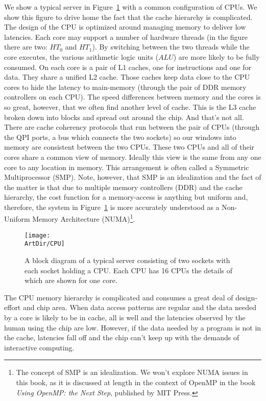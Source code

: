 We show a typical server in Figure~\ref{figure:CPU} with a common configuration of CPUs.   
We show this figure to drive home the fact that the cache hierarchy is complicated.  The design
of the CPU is optimized around managing memory to deliver low latencies.   Each core may
support a number of hardware threads (in the figure there are two: $HT_0$ and $HT_1$).  By switching between the two threads
while the core executes, the various arithmetic logic units ($ALU$) are more likely to be fully consumed.
On each core is a pair of L1 caches, one for instructions and one for
data.  They share a unified L2 cache.   Those caches keep data close to the CPU cores to hide the latency
to main-memory (through the pair of DDR memory controllers on each CPU).  The speed differences
between memory and the cores is so great, however, that we often find another level of cache.  This is the L3 
cache broken down into blocks and spread out around the chip.   And that's not all.  There are cache coherency
protocols that run between the pair of CPUs (through the QPI ports, a bus which connects the two sockets) 
so our windows into memory are
consistent between the two CPUs.  These two CPUs and all of their cores share a common view of memory. 
Ideally this view is the same from any one core to any location in memory. This arrangement is often 
called a Symmetric Multiprocessor (SMP).   Note, however, that SMP is an idealization and the fact of the matter
is that due to multiple memory controllers (DDR) and the cache hierarchy, the cost function for a memory-access is
anything but uniform and, therefore, the system in Figure~\ref{figure:CPU} is more accurately understood as a Non-Uniform Memory Architecture (NUMA)\footnote{
The concept of SMP is an idealization. We won't explore NUMA issues in this book, as it is discussed at length in
the context of OpenMP in the book \emph{Using OpenMP: the Next Step}, published by MIT Press.}.

\begin{figure}[t]
\centerline{\texttt{[image: \\ArtDir/CPU]}}
\caption{A block diagram of a typical server consisting of two sockets with each socket holding a CPU. Each
CPU has 16 CPUs the details of which are shown for one core.}
\label{figure:CPU}
\end{figure}

The CPU memory hierarchy is complicated and consumes a great deal of design-effort and chip area.  
When data access patterns are regular and the data needed by a core is likely to be in cache, all is well and 
the latencies observed by the human using the chip are low.  However, if the data needed by a program is
not in the cache, latencies fall off and the chip can't keep up with the demands of interactive computing.

